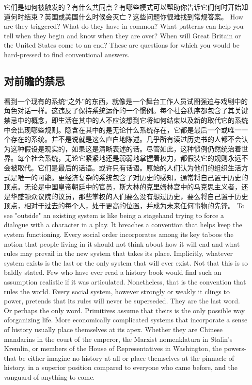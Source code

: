 \begin{paracol}{2}
\switchcolumn*
它们是如何被触发的？有什么共同点？有哪些模式可以帮助你告诉它们何时开始知道何时结束？英国或美国什么时候会灭亡？这些问题你很难找到常规答案。
\switchcolumn
How are they triggered? What do they have in common? What patterns can help you tell when they begin and know when they are over? When will Great Britain or the United States come to an end? These are questions for which you would be hard-pressed to find conventional answers.

\end{paracol}

\subsection{对前瞻的禁忌}
\begin{paracol}{2}
看到一个现有的系统“之外”的东西，就像是一个舞台工作人员试图强迫与戏剧中的角色对话一样。这违反了保持系统运作的一个惯例。每个社会秩序都包含了其关键禁忌中的概念，即生活在其中的人不应该想到它将如何结束以及新的取代它的系统中会出现哪些规则。隐含在其中的是无论什么系统存在，它都是最后一个或唯一一个存在的系统。并不是说就是这么直白地陈述。几乎所有读过历史书的人都不会认为这种假设是现实的，如果这是清晰表述的话。尽管如此，这种惯例仍然统治着世界。每个社会系统，无论它紧紧地还是弱弱地掌握着权力，都假装它的规则永远不会被取代。它们是最后的话语。或许只有话语。原始的人们认为他们的组织生活方式是唯一的可能。更经济复杂的系统包含了对历史的感知，通常将自己置于历史的顶点。无论是中国皇帝朝廷中的官员，斯大林的克里姆林宫中的马克思主义者，还是华盛顿众议院的议员，那些掌权的人们要么没有想过历史，要么将自己置于历史顶点，相对于过去的每个人，处于更高的位置，并成为未来任何事物的先锋。
\switchcolumn
To see "outside" an existing system is like being a stagehand trying to force a dialogue with a character in a play. It breaches a convention that helps keep the system functioning. Every social order incorporates among its key taboos the notion that people living in it should not think about how it will end and what rules may prevail in the new system that takes its place. Implicitly, whatever system exists is the last or the only system that will ever exist. Not that this is so baldly stated. Few who have ever read a history book would find such an assumption realistic if it was articulated. Nonetheless, that is the convention that rules the world. Every social system, however strongly or weakly it clings to power, pretends that its rules will never be superseded. They are the last word. Or perhaps the only word. Primitives assume that theirs is the only possible way oforganizing life. More economically complicated systems that incorporate a sense of history usually place themselves at its apex. Whether they are Chinese mandarins in the court of the emperor, the Marxist nomenklatura in Stalin's Kremlin, or members of the House of Representatives in Washington, the powers-that-be either imagine no history at all or place themselves at the pinnacle of history, in a superior position compared to everyone who came before, and the vanguard of anything to come.  


\end{paracol}

